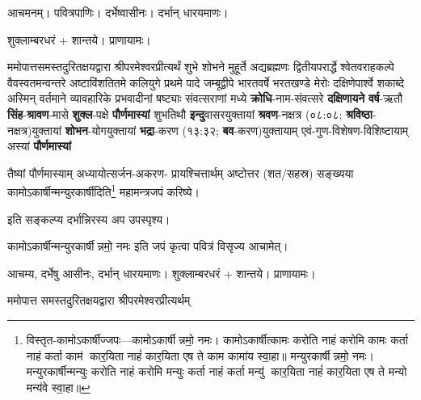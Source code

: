 
\setlength{\parindent}{0pt}

\newcommand{\sep}{\hspace{-0.5ex}{\small$\circ$}\hspace{0.5ex}}
\newcommand{\yutithyadi}{\textbf{क्रोधि}-नाम-संवत्सरे    \textbf{दक्षिणायने} \textbf{वर्ष}-ऋतौ   \textbf{सिंह}-\textbf{श्रावण}-मासे  \textbf{शुक्ल}-पक्षे    \textbf{पौर्णमास्यां} शुभतिथौ   \textbf{इन्दु}\-वासर\-युक्तायां \textbf{श्रवण}-नक्षत्र (०८:०८; \textbf{श्रविष्ठा}-नक्षत्र)\-युक्तायां   \textbf{शोभन}-योग\-युक्तायां    \textbf{भद्रा}-करण (१३:३२; \textbf{बव}-करण)\-युक्तायाम् एवं-गुण-विशेषण-विशिष्टायाम्     अस्यां \textbf{पौर्णमास्यां}}
\newcommand{\instruct}[2]{#1}
\begingroup


आचमनम्। पवित्रपाणिः। दर्भेष्वासीनः। दर्भान् धारयमाणः।

शुक्लाम्बरधरं + शान्तये। प्राणायामः।

ममोपात्तसमस्तदुरितक्षयद्वारा श्रीपरमेश्वरप्रीत्यर्थं शुभे शोभने मुहूर्ते अद्यब्रह्मणः
द्वितीयपरार्द्धे श्वेतवराहकल्पे वैवस्वतमन्वन्तरे अष्टाविंशतितमे कलियुगे प्रथमे पादे
जम्बूद्वीपे भारतवर्षे भरतखण्डे मेरोः दक्षिणेपार्श्वे शकाब्दे अस्मिन् वर्तमाने व्यावहारिके
 प्रभवादीनां षष्ट्याः संवत्सराणां मध्ये
\yutithyadi

तैष्यां पौर्णमास्याम् अध्यायोत्सर्जन-अकरण- प्रायश्चित्तार्थम् अष्टोत्तर (शत/सहस्र) सङ्ख्यया कामोऽकार्षीन्मन्युरकार्षीदिति\footnote{विस्तृत-कामोऽकार्षीज्जपः---कामोऽकार्\mbox{}षीन्नमो॒ नमः। 
 कामोऽकार्\mbox{}षीत्कामः करोति नाहं करोमि कामः कर्ता नाहं कर्ता काम॑ कार॒यिता नाहं॑ कार॒यिता एष ते काम कामा॑य स्वा॒हा॥ मन्युरकार्\mbox{}षीन्नमो॒ नमः। 
मन्युरकार्\mbox{}षीन्मन्युः करोति नाहं करोमि मन्युः कर्ता नाहं कर्ता मन्यु॑ कार॒यिता नाहं॑ कार॒यिता एष ते मन्यो मन्य॑वे स्वा॒हा॥} महा\-मन्त्र\-जपं करिष्ये।

\instruct{इति सङ्कल्प्य दर्भान्निरस्य अप उपस्पृश्य।}{என்று ஸங்கல்பம் செய்து கொண்டு தர்பைகளை கீழே போட்டுவிட்டு ஜலத்தை தொடவும்.}

\instruct{कामोऽकार्षीन्मन्युरकार्षीन्नमो॒  नमः  इति जपं कृत्वा पवित्रं विसृज्य आचामेत्।}{காமோகார்ஷீத் மன்யுரகார்ஷீன்னமோ நம: என்று ஜபித்து முடிவில் ப்ராணாயாமம் செய்து உபஸ்தானம் செய்யவும். பவித்ரத்தை விஸர்ஜனம் செய்து ஆசமனம் செய்யவும்.}


आचम्य, दर्भेषु आसीनः, दर्भान् धारयमाणः। शुक्लाम्बरधरं + शान्तये। प्राणायामः।

ममोपात्त समस्तदुरितक्षयद्वारा श्रीपरमेश्वरप्रीत्यर्थम्

